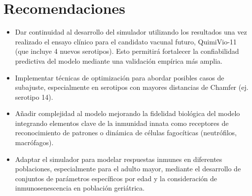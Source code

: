 \chapter*{Recomendaciones}\label{chapter:recomendations}

\begin{itemize}
    \item Dar continuidad al desarrollo del simulador utilizando los resultados una vez realizado el ensayo clínico para el candidato vacunal futuro, QuimiVio-11 (que incluye 4 nuevos serotipos). Esto permitirá fortalecer la confiabilidad predictiva del modelo mediante una validación empírica más amplia.

    \item Implementar técnicas de optimización para abordar posibles casos de subajuste, especialmente en serotipos con mayores distancias de Chamfer (ej. serotipo 14). 


    \item Añadir complejidad al modelo mejorando la fidelidad biológica del modelo integrando elementos clave de la inmunidad innata como receptores de reconocimiento de patrones o dinámica de células fagocíticas (neutrófilos, macrófagos).
    

    \item Adaptar el simulador para modelar respuestas inmunes en diferentes poblaciones, especialmente para el adulto mayor, mediante el desarrollo de conjuntos de parámetros específicos por edad y la consideración de inmunosenescencia en población geriátrica.
    

\end{itemize}